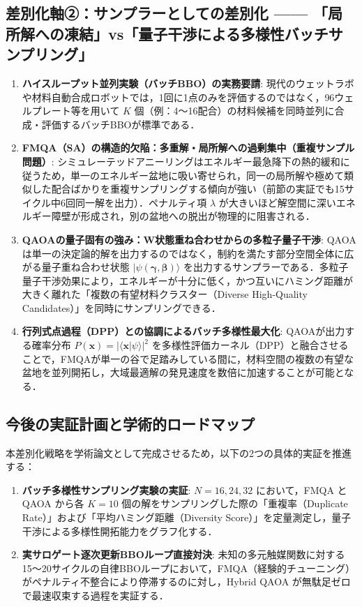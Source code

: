 \documentclass[11pt,a4paper]{ltjsarticle}
\begin{document}
\subsection{差別化軸②：サンプラーとしての差別化 —— 「局所解への凍結」vs「量子干渉による多様性バッチサンプリング」}
\begin{enumerate}\setlength{\itemsep}{0.8pt}
    \item \textbf{ハイスループット並列実験（バッチBBO）の実務要請}:
    現代のウェットラボや材料自動合成ロボットでは，1回に1点のみを評価するのではなく，96ウェルプレート等を用いて $K$ 個（例：4〜16配合）の材料候補を同時並列に合成・評価するバッチBBOが標準である．
    \item \textbf{FMQA（SA）の構造的欠陥：多重解・局所解への過剰集中（重複サンプル問題）}:
    シミュレーテッドアニーリングはエネルギー最急降下の熱的緩和に従うため，単一のエネルギー盆地に吸い寄せられ，同一の局所解や極めて類似した配合ばかりを重複サンプリングする傾向が強い（前節の実証でも15サイクル中6回同一解を出力）．ペナルティ項 $\lambda$ が大きいほど解空間に深いエネルギー障壁が形成され，別の盆地への脱出が物理的に阻害される．
    \item \textbf{QAOAの量子固有の強み：W状態重ね合わせからの多粒子量子干渉}:
    QAOAは単一の決定論的解を出力するのではなく，制約を満たす部分空間全体に広がる量子重ね合わせ状態 $|\psi(\bm{\gamma}, \bm{\beta})\rangle$ を出力するサンプラーである．多粒子量子干渉効果により，エネルギーが十分に低く，かつ互いにハミング距離が大きく離れた「複数の有望材料クラスター（Diverse High-Quality Candidates）」を同時にサンプリングできる．
    \item \textbf{行列式点過程（DPP）との協調によるバッチ多様性最大化}:
    QAOAが出力する確率分布 $P(\bm{x}) = |\langle \bm{x} | \psi \rangle|^2$ を多様性評価カーネル（DPP）と融合させることで，FMQAが単一の谷で足踏みしている間に，材料空間の複数の有望な盆地を並列開拓し，大域最適解の発見速度を数倍に加速することが可能となる．
\end{enumerate}

\subsection{今後の実証計画と学術的ロードマップ}
本差別化戦略を学術論文として完成させるため，以下の2つの具体的実証を推進する：
\begin{enumerate}\setlength{\itemsep}{0.8pt}
    \item \textbf{バッチ多様性サンプリング実験の実証}:
    $N=16, 24, 32$ において，FMQA と QAOA から各 $K=10$ 個の解をサンプリングした際の「重複率（Duplicate Rate）」および「平均ハミング距離（Diversity Score）」を定量測定し，量子干渉による多様性開拓能力をグラフ化する．
    \item \textbf{実サロゲート逐次更新BBOループ直接対決}:
    未知の多元触媒関数に対する15〜20サイクルの自律BBOループにおいて，FMQA（経験的チューニング）がペナルティ不整合により停滞するのに対し，Hybrid QAOA が無駄足ゼロで最速収束する過程を実証する．
\end{enumerate}
\end{document}
